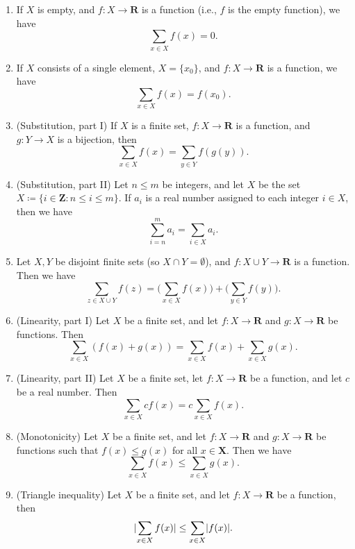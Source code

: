 \begin{proposition}\label{7.1.11}
    \mbox{}
    \begin{enumerate}
        \item If \(X\) is empty, and \(f : X \to \mathbf{R}\) is a function (i.e., \(f\) is the empty function), we have
              \[
                  \sum_{x \in X} f(x) = 0.
              \]
        \item If \(X\) consists of a single element, \(X = \{x_0\}\), and \(f : X \to \mathbf{R}\) is a function, we have
              \[
                  \sum_{x \in X} f(x) = f(x_0).
              \]
        \item (Substitution, part I) If \(X\) is a finite set, \(f : X \to \mathbf{R}\) is a function, and \(g : Y \to X\) is a bijection, then
              \[
                  \sum_{x \in X} f(x) = \sum_{y \in Y} f(g(y)).
              \]
        \item (Substitution, part II) Let \(n \leq m\) be integers, and let \(X\) be the set \(X \coloneqq \{i \in \mathbf{Z} : n \leq i \leq m\}\).
              If \(a_i\) is a real number assigned to each integer \(i \in X\), then we have
              \[
                  \sum_{i = n}^m a_i = \sum_{i \in X} a_i.
              \]
        \item Let \(X, Y\) be disjoint finite sets (so \(X \cap Y = \emptyset\)), and \(f : X \cup Y \to \mathbf{R}\) is a function.
              Then we have
              \[
                  \sum_{z \in X \cup Y} f(z) = \Bigg(\sum_{x \in X} f(x)\Bigg) + \Bigg(\sum_{y \in Y} f(y)\Bigg).
              \]
        \item (Linearity, part I) Let \(X\) be a finite set, and let \(f : X \to \mathbf{R}\) and \(g : X \to \mathbf{R}\) be functions.
              Then
              \[
                  \sum_{x \in X} (f(x) + g(x)) = \sum_{x \in X} f(x) + \sum_{x \in X} g(x).
              \]
        \item (Linearity, part II) Let \(X\) be a finite set, let \(f : X \to \mathbf{R}\) be a function, and let \(c\) be a real number.
              Then
              \[
                  \sum_{x \in X} cf(x) = c\sum_{x \in X} f(x).
              \]
        \item (Monotonicity) Let \(X\) be a finite set, and let \(f : X \to \mathbf{R}\) and \(g : X \to \mathbf{R}\) be functions such that \(f(x) \leq g(x)\) for all \(x \in \mathbf{X}\).
              Then we have
              \[
                  \sum_{x \in X} f(x) \leq \sum_{x \in X} g(x).
              \]
        \item (Triangle inequality) Let \(X\) be a finite set, and let \(f : X \to \mathbf{R}\) be a function, then
              \[
                  \lvert\sum_{x \in X} f(x)\rvert \leq \sum_{x \in X} \lvert f(x)\rvert.
              \]
    \end{enumerate}
\end{proposition}

